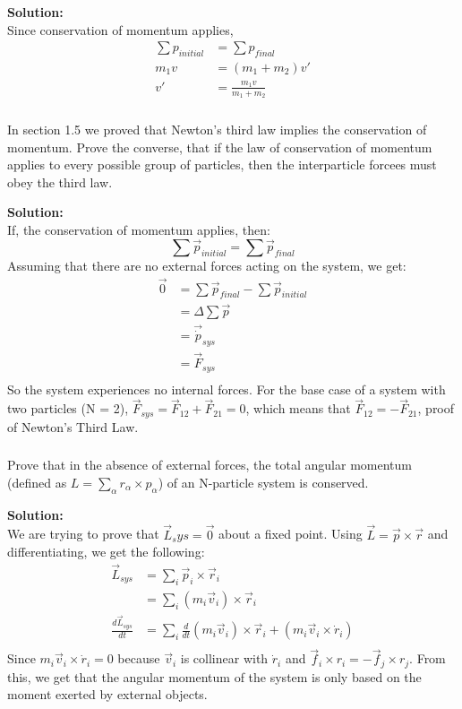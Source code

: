 \documentclass{article}
\newcommand\Problem{%
    \subsubsection{}%
}
\newcommand\TheSolution{%
  \textbf{Solution:}\\%
}
\begin{document}
\TheSolution Since conservation of momentum applies,
\begin{equation}
    \begin{aligned}
        \sum p_{initial} & = \sum p_{final}          \\
        m_1 v            & = (m_1 + m_2) v'          \\
        v'               & = \frac{m_1 v}{m_1 + m_2}
    \end{aligned}
\end{equation}

\Problem
In section 1.5 we proved that Newton's third law implies the conservation of momentum. Prove the converse, that if the law of conservation of momentum applies to every possible group of particles, then the interparticle forcees must obey the third law.

\TheSolution
If, the conservation of momentum applies, then:
\[\sum \vec{p}_{initial} = \sum \vec{p}_{final} \]
Assuming that there are no external forces acting on the system, we get:
\begin{equation}
    \begin{aligned}
        \vec{0} & = \sum \vec{p}_{final} - \sum \vec{p}_{initial} \\
                & = \Delta \sum \vec{p}                           \\
                & = \vec{\dot{p}}_{sys}                           \\
                & = \vec{F}_{sys}                                 \\
    \end{aligned}
\end{equation}
So the system experiences no internal forces. For the base case of a system with two particles (N = 2), $\vec{F}_{sys} = \vec{F}_{12} + \vec{F}_{21} = 0$, which means that $\vec{F}_{12} = -\vec{F}_{21}$, proof of Newton's Third Law.

\Problem Prove that in the absence of external forces, the total angular momentum (defined as $L = \sum_{\alpha} r_\alpha \times p_\alpha$) of an N-particle system is conserved.

\TheSolution
We are trying to prove that $\vec{L}_sys = \vec{0}$ about a fixed point. Using $\vec{L} = \vec{p} \times \vec{r}$ and differentiating, we get the following:
\begin{equation}
    \begin{aligned}
        \vec{L}_{sys}             & = \sum_i \vec{p}_i \times \vec{r}_i                                                      \\
                                  & = \sum_i (m_i \vec{v}_i) \times \vec{r}_i                                                \\
        \frac{d\vec{L}_{sys}}{dt} & = \sum_i \frac{d}{dt}(m_i \vec{v}_i) \times \vec{r}_i + (m_i \vec{v}_i \times \dot{r}_i) \\
    \end{aligned}
\end{equation}
Since $m_i \vec{v}_i \times \dot{r}_i = 0$ because $\vec{v}_i$ is collinear with $\dot{r}_i$ and $\vec{f}_i \times r_i = -\vec{f}_j \times r_j$. From this, we get that the angular momentum of the system is only based on the moment exerted by external objects.
\end{document}

